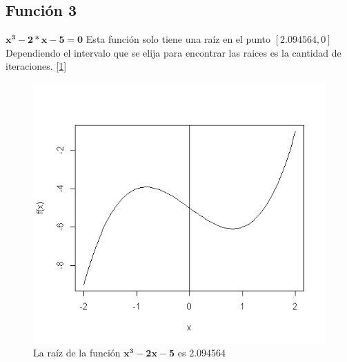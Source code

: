 \documentclass[12pt,a4paper]{article}
\begin{document}
\newpage
\subsection{Función 3}
$\mathbf{x^3-2*x-5=0}$ Esta función solo tiene una raíz en el punto $[2.094564, 0]$
Dependiendo el intervalo que se elija para encontrar las raices es la cantidad de iteraciones. [\ref{funcion3}]

\begin{figure}
\centering
\includegraphics[scale=0.8]{funcion3}
\caption{La raíz de la función $\mathbf{x^3-2x-5}$ es 2.094564}
\label{funcion3}
\end{figure}



\end{document}
